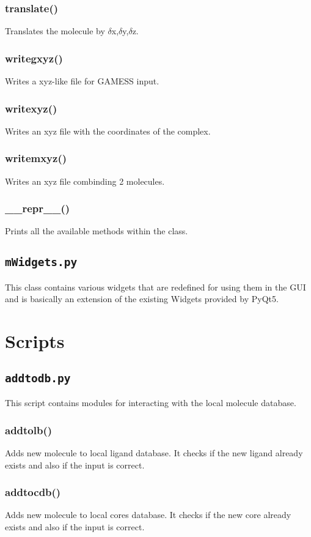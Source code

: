 \documentclass[a4paper,12pt]{assignment}
\begin{document}
\subsubsection{translate()}
Translates the molecule by $\delta$x,$\delta$y,$\delta$z.
\subsubsection{writegxyz()}
Writes a xyz-like file for GAMESS input.
\subsubsection{writexyz()}
Writes an xyz file with the coordinates of the complex.
\subsubsection{writemxyz()}
Writes an xyz file combinding 2 molecules.
\subsubsection{\_\_repr\_\_()}
Prints all the available methods within the class.

\subsection{\texttt{mWidgets.py}}
This class contains various widgets that are redefined for using them in the GUI and is basically an extension of the existing Widgets provided by PyQt5.

\section{Scripts}
\subsection{\texttt{addtodb.py}}
This script contains modules for interacting with the local molecule database.
\subsubsection{addtolb()} 
Adds new molecule to local ligand database. It checks if the new ligand already exists and also if the input is correct.
\subsubsection{addtocdb()}
Adds new molecule to local cores database. It checks if the new core already exists and also if the input is correct.
\end{document}

